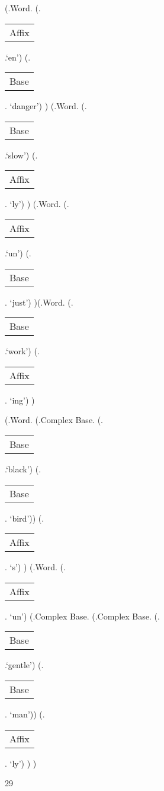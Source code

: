 \documentclass[12pt,letterpaper]{article}
\begin{document}
\clearpage
\begin{figure}
	\begin{center}
		\begin{parsetree}
			(.Word.
			(.\begin{tabular}{c}Affix\end{tabular}.`en')
			(.\begin{tabular}{c}Base\end{tabular}. `danger')
			)
			(.Word.
			(.\begin{tabular}{c}Base\end{tabular}.`slow')
			(.\begin{tabular}{c}Affix\end{tabular}. `ly')
			)
			(.Word.
			(.\begin{tabular}{c}Affix\end{tabular}.`un')
			(.\begin{tabular}{c}Base\end{tabular}. `just')
			)(.Word.
			(.\begin{tabular}{c}Base\end{tabular}.`work')
			(.\begin{tabular}{c}Affix\end{tabular}. `ing')
			)
			
			\hfill \break\hfill \break
			(.Word.
			(.Complex Base.
			(.\begin{tabular}{c}Base\end{tabular}.`black')
			(.\begin{tabular}{c}Base\end{tabular}. `bird'))
			(.\begin{tabular}{c}Affix\end{tabular}. `s')
			)
			(.Word.
			(.\begin{tabular}{c}Affix\end{tabular}. `un')
			(.Complex Base.
			(.Complex Base.
			(.\begin{tabular}{c}Base\end{tabular}.`gentle')
			(.\begin{tabular}{c}Base\end{tabular}. `man'))
			(.\begin{tabular}{c}Affix\end{tabular}. `ly')
			)
			)
			
			\hfill \break\hfill \break
		\end{parsetree}
		29
	\end{center}
\end{figure}
\end{document}
